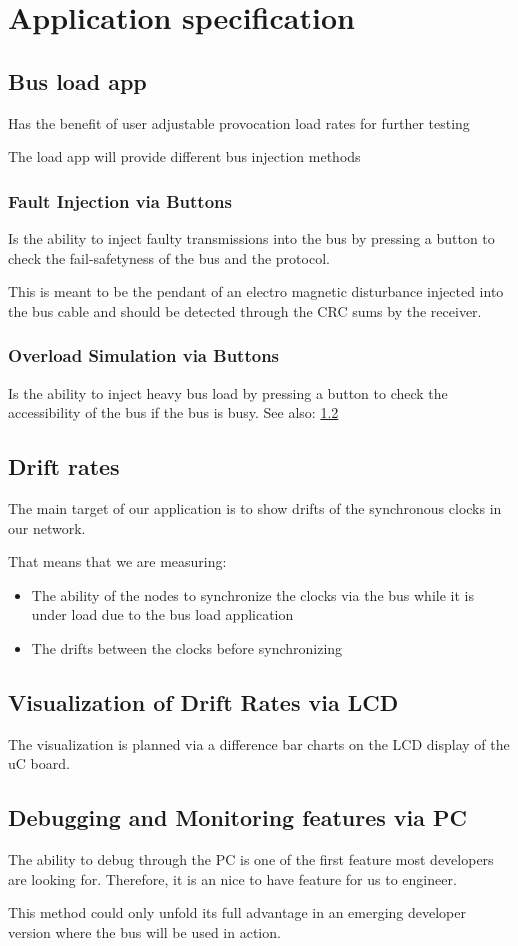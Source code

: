 \section{Application specification}

\subsection{Bus load app}
\label{app_specification:bus_load}
Has the benefit of user adjustable provocation load rates for 
further testing

The load app will provide different bus injection methods
\subsubsection{Fault Injection via Buttons}
Is the ability to inject faulty transmissions into the bus by pressing
a button to check the fail-safetyness of the bus and the protocol.

This is meant to be the pendant of an electro magnetic disturbance
injected into the bus cable and should be detected through the
CRC sums by the receiver.

\subsubsection{Overload Simulation via Buttons}
Is the ability to inject heavy bus load by pressing a button to
check the accessibility of the bus if the bus is busy. 
See also: \ref{app_specification:drift_rates} 

\subsection{Drift rates}
\label{app_specification:drift_rates}
The main target of our application is to show drifts of the synchronous 
clocks in our network. 

That means that we are measuring:
\begin{itemize}
 \item The ability of the nodes to synchronize the clocks via the bus 
while it is under load due to the bus load application
 \item The drifts between the clocks before synchronizing
\end{itemize}

\subsection{Visualization of Drift Rates via LCD}
The visualization is planned via a difference bar charts on the 
LCD display of the uC board.

\subsection{Debugging and Monitoring features via PC}
The ability to debug through the PC is one of the first 
feature most developers are looking for. Therefore, it is an
nice to have feature for us to engineer. 

This method could only unfold its full advantage in an emerging 
developer version where the bus will be used in action.

